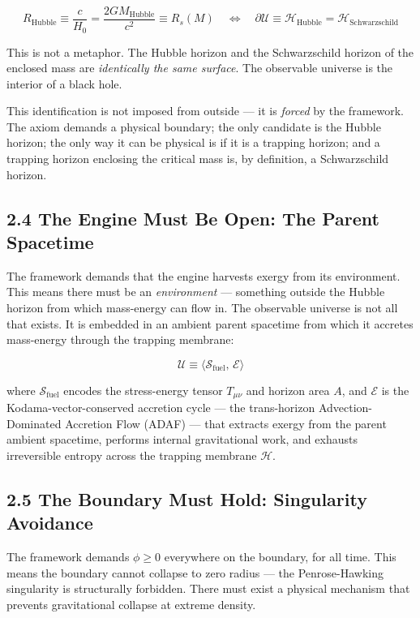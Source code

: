 \documentclass[11pt,a4paper]{article}
\theoremstyle{definition}\newtheorem{definition}{Definition}
\theoremstyle{remark}\newtheorem{remark}{Remark}
\begin{document}
\begin{equation}
\boxed{R_{\text{Hubble}} \equiv \frac{c}{H_0} = \frac{2 G M_{\text{Hubble}}}{c^2} \equiv R_s(M) \quad \Longleftrightarrow \quad \partial\mathcal{U} \equiv \mathcal{H}_{\text{Hubble}} = \mathcal{H}_{\text{Schwarzschild}}}
\end{equation}


This is not a metaphor. The Hubble horizon and the Schwarzschild horizon of the enclosed mass are \textit{identically the same surface}. The observable universe is the interior of a black hole.

This identification is not imposed from outside — it is \textit{forced} by the framework. The axiom demands a physical boundary; the only candidate is the Hubble horizon; the only way it can be physical is if it is a trapping horizon; and a trapping horizon enclosing the critical mass is, by definition, a Schwarzschild horizon.
\subsection{2.4 The Engine Must Be Open: The Parent Spacetime}

The framework demands that the engine harvests exergy from its environment. This means there must be an \textit{environment} — something outside the Hubble horizon from which mass-energy can flow in. The observable universe is not all that exists. It is embedded in an ambient parent spacetime from which it accretes mass-energy through the trapping membrane:


\begin{equation}
\boxed{\mathcal{U} \equiv \langle \mathcal{S}_{\text{fuel}},\, \mathcal{E} \rangle}
\end{equation}


where $\mathcal{S}_{\text{fuel}}$ encodes the stress-energy tensor $T_{\mu\nu}$ and horizon area $A$, and $\mathcal{E}$ is the Kodama-vector-conserved accretion cycle — the trans-horizon Advection-Dominated Accretion Flow (ADAF) — that extracts exergy from the parent ambient spacetime, performs internal gravitational work, and exhausts irreversible entropy across the trapping membrane $\mathcal{H}$.
\subsection{2.5 The Boundary Must Hold: Singularity Avoidance}

The framework demands $\phi \ge 0$ everywhere on the boundary, for all time. This means the boundary cannot collapse to zero radius — the Penrose-Hawking singularity is structurally forbidden. There must exist a physical mechanism that prevents gravitational collapse at extreme density.
\end{document}
